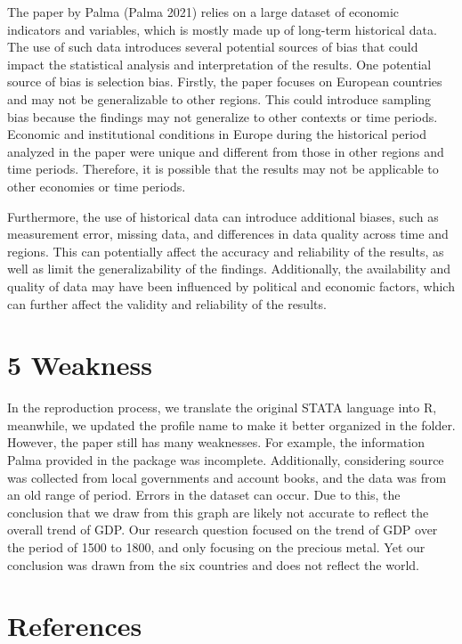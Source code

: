 \documentclass[
  letterpaper,
  DIV=11,
  numbers=noendperiod]{scrartcl}
\begin{document}
The paper by Palma (Palma 2021) relies on a large dataset of economic
indicators and variables, which is mostly made up of long-term
historical data. The use of such data introduces several potential
sources of bias that could impact the statistical analysis and
interpretation of the results. One potential source of bias is selection
bias. Firstly, the paper focuses on European countries and may not be
generalizable to other regions. This could introduce sampling bias
because the findings may not generalize to other contexts or time
periods. Economic and institutional conditions in Europe during the
historical period analyzed in the paper were unique and different from
those in other regions and time periods. Therefore, it is possible that
the results may not be applicable to other economies or time periods.

Furthermore, the use of historical data can introduce additional biases,
such as measurement error, missing data, and differences in data quality
across time and regions. This can potentially affect the accuracy and
reliability of the results, as well as limit the generalizability of the
findings. Additionally, the availability and quality of data may have
been influenced by political and economic factors, which can further
affect the validity and reliability of the results.

\hypertarget{weakness}{%
\section{5 Weakness}\label{weakness}}

In the reproduction process, we translate the original STATA language
into R, meanwhile, we updated the profile name to make it better
organized in the folder. However, the paper still has many weaknesses.
For example, the information Palma provided in the package was
incomplete. Additionally, considering source was collected from local
governments and account books, and the data was from an old range of
period. Errors in the dataset can occur. Due to this, the conclusion
that we draw from this graph are likely not accurate to reflect the
overall trend of GDP. Our research question focused on the trend of GDP
over the period of 1500 to 1800, and only focusing on the precious
metal. Yet our conclusion was drawn from the six countries and does not
reflect the world.

\newpage

\hypertarget{references}{%
\section*{References}\label{references}}
\end{document}
